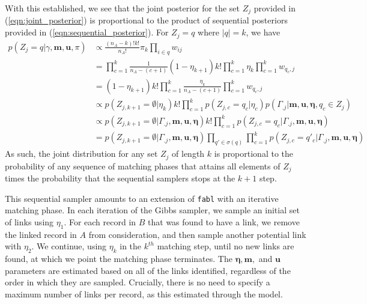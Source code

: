 \documentclass[12pt,letterpaper]{article}
\newcommand{\1}[1]{\mathbb{I}\!\left[#1\right]} %
\def \brian#1{{\color{red} (#1)}}
\begin{document}
With this established, we see that the joint posterior for the set $Z_j$ provided in (\ref{eqn:joint_posterior}) is proportional to the product of sequential posteriors provided in (\ref{eqn:sequential_posterior}). For $Z_j = q$ where $|q| = k$, we have
\begin{align}
	p\left(Z_j  = q |\gamma, \bm{m}, \bm{u}, \pi\right) &\propto \frac{(n_A - k)!k!}{n_A!} \pi_{k} \prod_{i \in q} w_{ij} \\
	&= \prod_{c = 1}^{k} \frac{1}{n_A - (c + 1)} (1 - \eta_{k+1}) k!\prod_{c = 1}^{k} \eta_{k} \prod_{c = 1}^{k} w_{q_c, j} \\
	&= (1 - \eta_{k+1}) k!\prod_{c = 1}^{k} \frac{\eta_{k} }{n_A - (c + 1)}  \prod_{c = 1}^{k} w_{q_c, j} \\
	&\propto p(Z_{j, k+1} = \emptyset| \eta_{k})k! \prod_{c = 1}^{k} p(Z_{j, c} = q_c|\eta_c) p(\Gamma_{.j}| \bm{m}, \bm{u}, \bm{\eta}, q_c \in Z_j) \\
	&\propto p(Z_{j, k+1} = \emptyset | \Gamma_{.j}, \bm{m}, \bm{u}, \bm{\eta}) k!\prod_{c = 1}^{k} p(Z_{j, c} = q_c|\Gamma_{.j}, \bm{m}, \bm{u}, \bm{\eta}) \\
	&= p(Z_{j, k+1} = \emptyset | \Gamma_{.j}, \bm{m}, \bm{u}, \bm{\eta}) \prod_{q' \in \sigma(q)} \prod_{c = 1}^{k} p(Z_{j, c} = q'_c|\Gamma_{.j}, \bm{m}, \bm{u}, \bm{\eta})
\end{align}
As such, the joint distribution for any set $Z_j$ of length $k$ is proportional to the probability of any sequence of matching phases that attains all elements of $Z_j$ times the probability that the sequential samplers stops at the $k+1$ step. 

This sequential sampler amounts to an extension of \texttt{fabl} with an iterative matching phase. In each iteration of the Gibbs sampler, we sample an initial set of links using $\eta_1$. For each record in $B$ that was found to have a link, we remove the linked record in $A$ from consideration, and then sample another potential link with $\eta_2$. We continue, using $\eta_k$ in the $k^{th}$ matching step, until no new links are found, at which we point the matching phase terminates. The $\bm{\eta}, \bm{m},$ and $\bm{u}$ parameters are estimated based on all of the links identified, regardless of the order in which they are sampled. Crucially, there is no need to specify a maximum number of links per record, as this estimated through the model.
\end{document}
